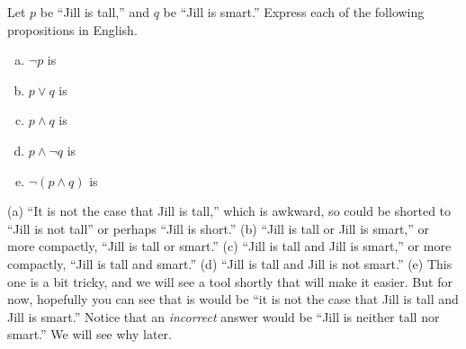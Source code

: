 %

\begin{exer}
Let $p$ be ``Jill is tall,'' and
$q$ be ``Jill is smart.''
Express each of the following propositions in English. 
\begin{enumerate}[(a)]
\item
$\neg p$ is \blanklinefill
\item
$p\vee q$ is \blanklinefill
\item
$p\wedge q$ is \blanklinefill
\item
$p\wedge \neg q$ is \blanklinefill
\item
$\neg(p\wedge q)$ is \blanklinefill
\end{enumerate}
\begin{answer}
(a) ``It is not the case that Jill is tall,'' 
which is awkward, so could be shorted to
``Jill is not tall'' or perhaps ``Jill is short.''
(b) ``Jill is tall or Jill is smart,'' or more compactly, 
``Jill is tall or smart.''
(c) ``Jill is tall and Jill is smart,'' or more compactly, 
``Jill is tall and smart.''
(d) ``Jill is tall and Jill is not smart.''
(e) This one is a bit tricky, and we will see a tool shortly 
that will make it easier. But for now, hopefully you can see
that is would be ``it is not the case that Jill is tall and Jill is smart.''
Notice that an {\em incorrect} answer would be
``Jill is neither tall nor smart.'' We will see why later.
\end{answer}
\end{exer}

